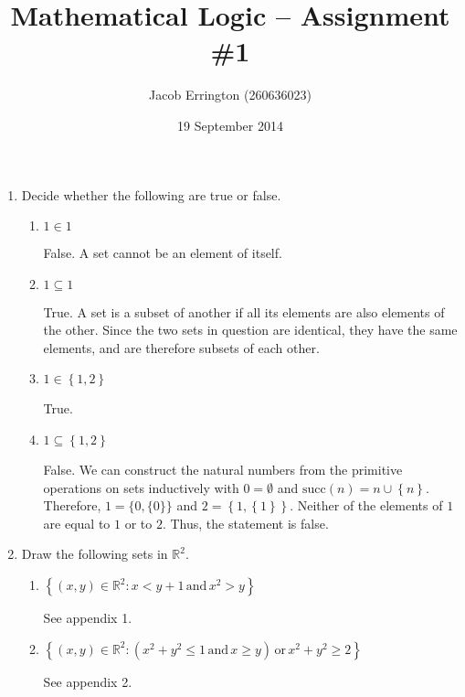 \documentclass{article}
\author{Jacob Errington (260636023)}
\date{19 September 2014}
\title{Mathematical Logic -- Assignment \#1}
\newcommand*{\problem}{}
\newcommand{\R}{\mathbb{R}}
\begin{document}
\maketitle

\begin{enumerate}
    \item \problem{Decide whether the following are true or false.}
        \begin{enumerate}
            \item $1 \in 1$

                False. A set cannot be an element of itself.

            \item $1 \subseteq 1$

                True. A set is a subset of another if all its elements are also elements of the
                other. Since the two sets in question are identical, they have the same elements,
                and are therefore subsets of each other.

            \item $1 \in \left\{ 1, 2 \right\}$

                True.

            \item $1 \subseteq \left\{ 1, 2 \right\}$

                False. We can construct the natural numbers from the primitive operations on sets
                inductively with $0 = \emptyset$ and $\mathrm{succ}(n) = n \cup \left\{ n \right\}$.  Therefore, $1 =
                \{0, \{ 0 \}\}$ and $2 = \left\{1, \left\{ 1 \right\}\right\}$. Neither of the elements of $1$ are equal
                to $1$ or to $2$. Thus, the statement is false.

        \end{enumerate}

    \item \problem{Draw the following sets in $\R^2$.}
        \begin{enumerate}
            \item $\left\{(x, y) \in \R^2 : x < y + 1 \, \mathrm{and} \, x^2 > y\right\}$

                See appendix 1.

            \item $\left\{(x, y) \in \R^2 : \left( x^2 + y^2 \leq 1 \, \mathrm{and} \, x \geq y\right)
                \, \mathrm{or} \, x^2 + y^2 \geq 2\right\}$

                See appendix 2.


\end{enumerate}
\end{enumerate}
\end{document}
